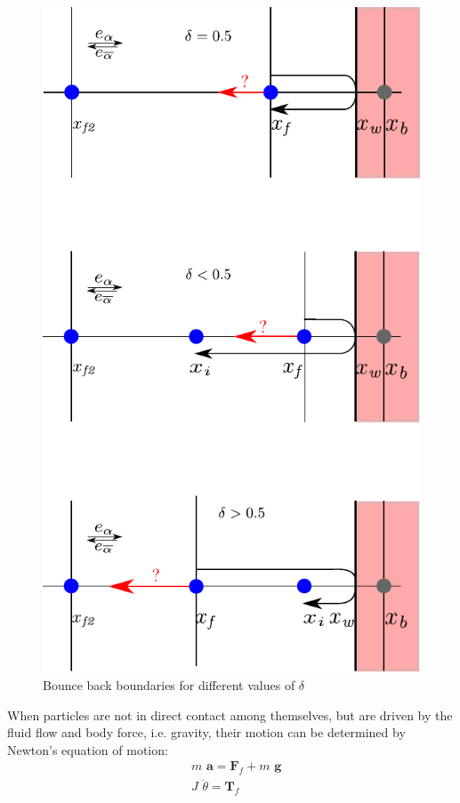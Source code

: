 \begin{figure}[htbp]
\centering
\includegraphics[scale=1]{Chapter3/figures/lbm/bouncemod.pdf}
\caption{Bounce back boundaries for different values of $\delta$}
\label{fig:bouncemod}
\end{figure}
When particles are not in direct contact among themselves, but are driven by the fluid flow and body force, i.e. gravity, their motion can be determined by Newton's equation of motion:
\begin{align}
& \textit{m}\textbf{ a}=\textbf{F}_{f} + \textit{m }\textbf{g} \\
& \textit{J } \ddot{\theta} =  \textbf{T}_{f}
\end{align}
